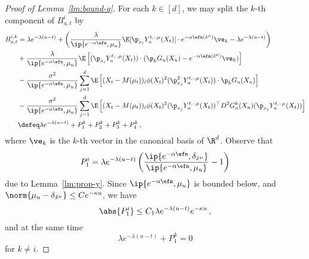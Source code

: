 \documentclass{amsart}
\begin{document}
\begin{proof}[Proof of Lemma~\ref{lm:bound-q}]
	For each $k \in [d]$, we may split the $k$-th component of $B^i_{u,t}$ by 
	\begin{align*}
		B^{i,k}_{u,t} & = \lambda e^{-\lambda (u-t)} + \left( \frac{\lambda}{\ip{e^{-\alpha\efn},\mu_u}} \E[\p_{x_i} Y^{t,\cdot,\mu}_u(X_t)] \cdot e^{-\alpha \efn(\tilde x^\mu)} \ve_k - \lambda e^{-\lambda (u-t)} \right) \\
		& + \frac{\lambda}{\ip{e^{-\alpha\efn},\mu_u}} \E \left[ (\p_{x_i} Y^{t,\cdot,\mu}_u(X_t)) \cdot (\p_k G_u(X_u) - e^{-\alpha \efn(\tilde x^\mu)} \ve_k) \right] \\
		& - \frac{\sigma^2}{\ip{e^{-\alpha\efn},\mu_u}} \sum_{j=1}^d \E \left[(X_t - M(\mu_t))_i \phi(X_t)^2  (\p_{x_j}^2 Y^{t,\cdot,\mu}_u(X_t)) \cdot \p_k G_u(X_u) \right] \\
		& - \frac{\sigma^2}{\ip{e^{-\alpha\efn},\mu_u}} \sum_{j=1}^d \E \left[(X_t - M(\mu_t))_i \phi(X_t)^2  (\p_{x_j} Y^{t,\cdot,\mu}_u (X_t))^\top D^2 G^k_u(X_u) (\p_{x_j} Y^{t,\cdot,\mu}_u(X_t))  \right] \\
		& \defeq \lambda e^{-\lambda (u-t)} + P^k_1 + P^k_2 + P^k_3 + P^k_4 \,,
	\end{align*}
	where $\ve_k$ is the $k$-th vector in the canonical basis of $\R^d$.
	Observe that 
	\begin{equation*}
		P^i_1 = \lambda e^{-\lambda (u-t)} \left( \frac{\ip{e^{-\alpha\efn},\delta_{\tilde x^\mu}}}{\ip{e^{-\alpha\efn},\mu_u}} - 1 \right)
	\end{equation*}
	due to Lemma~\ref{lm:prop-y}. 
	Since $\ip{e^{-\alpha\efn},\mu_u}$ is bounded below, and $\norm{\mu_u - \delta_{\tilde x^\mu}} \le C e^{-\kappa u}$, we have 
	\begin{equation*}
		\abs{P^i_1} \le C_1 \lambda e^{-\lambda (u-t)} e^{-\kappa u} \,,
	\end{equation*}
    and at the same time 
    \begin{equation*}
        \lambda e^{-\lambda (u-t)} + P^k_1 = 0 
    \end{equation*}
    for $k \neq i$.


\end{proof}
\end{document}
